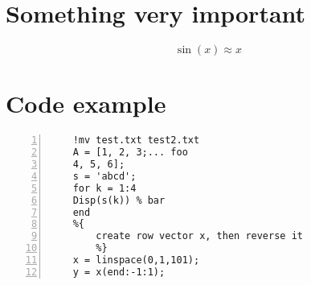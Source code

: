 \chapter{Something very important}
\label{app:details}

\[
    \sin(x) \approx x
\]

\chapter{Code example}

\begin{lstlisting}[style=Matlab-editor, frame=single, numbers=left,]
	%% Пример кода Matlab
	!mv test.txt test2.txt
	A = [1, 2, 3;... foo
	4, 5, 6];
	s = 'abcd';
	for k = 1:4
	Disp(s(k)) % bar
	end
	%{
		create row vector x, then reverse it
		%}
	x = linspace(0,1,101);
	y = x(end:-1:1);
\end{lstlisting}